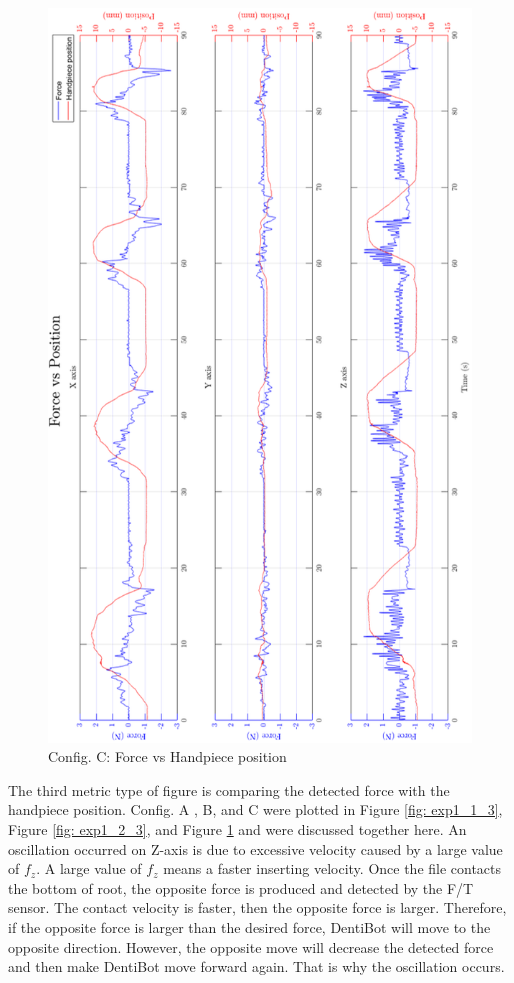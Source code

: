 \begin{figure}[htbp]
\begin{center}
\includegraphics[width=0.9\linewidth]{Images/exp/exp1_3_3.png}
\caption{Config. C: Force vs Handpiece position}
\label{fig: exp1_3_3}
\end{center}
\end{figure}

\par
The third metric type of figure is comparing the detected force with the handpiece position. Config. A , B, and C were plotted in Figure \ref{fig: exp1_1_3}, Figure \ref{fig: exp1_2_3}, and Figure \ref{fig: exp1_3_3} and were discussed together here. An oscillation occurred on Z-axis is due to excessive velocity caused by a large value of $f_z$. A large value of $f_z$ means a faster inserting velocity. Once  the file contacts the bottom of root, the opposite force is produced and detected by the F/T sensor. The contact velocity is faster, then the opposite force is larger. Therefore, if the opposite force is larger than the desired force, DentiBot will move to the opposite direction. However, the opposite move will decrease the detected force and then make DentiBot move forward again. That is why the oscillation occurs.
